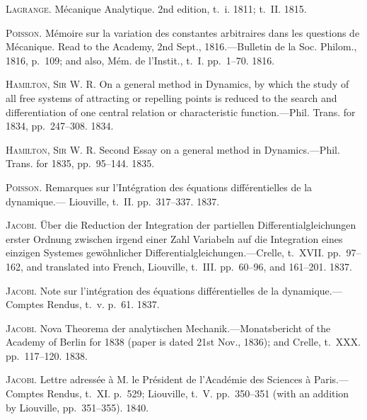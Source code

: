 \documentclass[12pt,a4paper]{article}
\theoremstyle{definition}
\begin{document}
\noindent\textsc{Lagrange}. M\'ecanique Analytique. 2nd edition, t.~i. 1811; t.~II. 1815.

\smallskip

\noindent\textsc{Poisson}. M\'emoire sur la variation des constantes arbitraires dans les questions de
M\'ecanique. Read to the Academy, 2nd Sept., 1816.---Bulletin de la Soc. Philom.,
1816, p.~109; and also, M\'em. de l'Instit., t.~I. pp.~1--70. 1816.

\smallskip

\noindent\textsc{Hamilton, Sir W. R.} On a general method in Dynamics, by which the study of all
free systems of attracting or repelling points is reduced to the search and differentiation
of one central relation or characteristic function.---Phil. Trans. for 1834,
pp.~247--308. 1834.

\smallskip

\noindent\textsc{Hamilton, Sir W. R.} Second Essay on a general method in Dynamics.---Phil. Trans.
for 1835, pp.~95--144. 1835.

\smallskip

\noindent\textsc{Poisson}. Remarques sur l'Int\'egration des \'equations diff\'erentielles de la dynamique.---
Liouville, t.~II. pp.~317--337. 1837.

\smallskip

\noindent\textsc{Jacobi}. \"Uber die Reduction der Integration der partiellen Differentialgleichungen
erster Ordnung zwischen irgend einer Zahl Variabeln auf die Integration eines
einzigen Systemes gew\"ohnlicher Differentialgleichungen.---Crelle, t.~XVII. pp.~97--162,
and translated into French, Liouville, t.~III. pp.~60--96, and 161--201. 1837.

\smallskip

\noindent\textsc{Jacobi}. Note sur l'int\'egration des \'equations diff\'erentielles de la dynamique.---Comptes
Rendus, t.~v. p.~61. 1837.

\smallskip

\noindent\textsc{Jacobi}. Nova Theorema der analytischen Mechanik.---Monatsbericht of the Academy
of Berlin for 1838 (paper is dated 21st Nov., 1836); and Crelle, t.~XXX. pp.~117--120.
1838.

\smallskip

\noindent\textsc{Jacobi}. Lettre adress\'ee \`a M. le Pr\'esident de l'Acad\'emie des Sciences \`a Paris.---
Comptes Rendus, t.~XI. p.~529; Liouville, t.~V. pp.~350--351 (with an addition by
Liouville, pp.~351--355). 1840.

\smallskip
\end{document}
